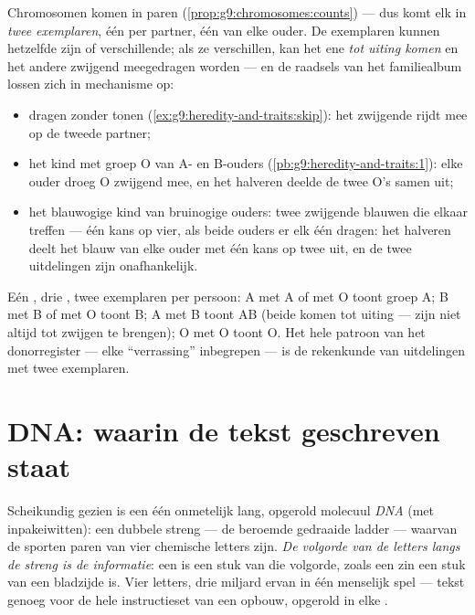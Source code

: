 \begin{proposition}\label{prop:g9:genes-and-dna:twocopies}
Chromosomen komen in paren
(\cref{prop:g9:chromosomes:counts}) --- dus komt elk  in
\emph{twee exemplaren}, één per partner, één van elke ouder.
De exemplaren kunnen hetzelfde  zijn of verschillende;
als ze verschillen, kan het ene \emph{tot uiting komen} en het
andere zwijgend meegedragen worden --- en de raadsels van het
familiealbum lossen zich in mechanisme op:
\begin{itemize}
  \item dragen zonder tonen
        (\cref{ex:g9:heredity-and-traits:skip}): het zwijgende
         rijdt mee op de tweede partner;
  \item het kind met groep O van A- en B-ouders
        (\cref{pb:g9:heredity-and-traits:1}): elke ouder droeg
        O zwijgend mee, en het halveren deelde de twee O's
        samen uit;
  \item het blauwogige kind van bruinogige ouders: twee
        zwijgende blauwen die elkaar treffen --- één kans op
        vier, als beide ouders er elk één dragen: het halveren
        deelt het blauw van elke ouder met één kans op twee
        uit, en de twee uitdelingen zijn onafhankelijk.
\end{itemize}
\end{proposition}
\admitted

\begin{example}\label{ex:g9:genes-and-dna:bloodgroups}
Eén , drie , twee exemplaren per persoon: A met A of
met O toont groep A; B met B of met O toont B; A met B toont AB
(beide komen tot uiting ---  zijn niet altijd tot zwijgen
te brengen); O met O toont O. Het hele patroon van het
donorregister --- elke ``verrassing'' inbegrepen --- is de
rekenkunde van uitdelingen met twee exemplaren.
\end{example}

\section{DNA: waarin de tekst geschreven staat}

\begin{definition}[DNA]\label{def:g9:genes-and-dna:dna}
Scheikundig gezien is een  één onmetelijk lang,
opgerold molecuul \emph{DNA} (met inpakeiwitten): een
dubbele streng --- de beroemde gedraaide ladder --- waarvan de
sporten paren van vier chemische letters zijn. \emph{De volgorde
van de letters langs de streng is de informatie}: een  is een
stuk van die volgorde, zoals een zin een stuk van een bladzijde
is. Vier letters, drie miljard ervan in één menselijk spel ---
tekst genoeg voor de hele instructieset van een opbouw, opgerold
in elke .
\end{definition}

